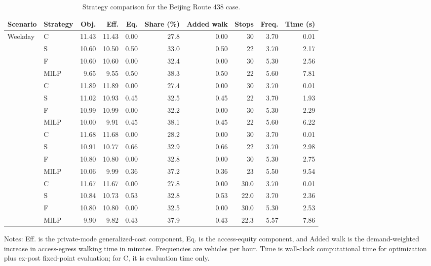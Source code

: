 \begin{table}[htbp]
\centering
\small
\caption{Strategy comparison for the Beijing Route 438 case.}
\label{tab:route438_strategy}
\begin{threeparttable}
\begin{tabular}{llrrrrrrrr}
\toprule
Scenario & Strategy & Obj. & Eff. & Eq. & Share (\%) & Added walk & Stops & Freq. & Time (s) \\
\midrule
\multirow{4}{*}{Weekday} & C & 11.43 & 11.43 & 0.00 & 27.8 & 0.00 & 30 & 3.70 & 0.01 \\
 & S & 10.60 & 10.50 & 0.50 & 33.0 & 0.50 & 22 & 3.70 & 2.17 \\
 & F & 10.60 & 10.60 & 0.00 & 32.4 & 0.00 & 30 & 5.30 & 2.56 \\
 & MILP & 9.65 & 9.55 & 0.50 & 38.3 & 0.50 & 22 & 5.60 & 7.81 \\
\addlinespace[1.5pt]
\multirow{4}{*}{Weekend} & C & 11.89 & 11.89 & 0.00 & 27.4 & 0.00 & 30 & 3.70 & 0.01 \\
 & S & 11.02 & 10.93 & 0.45 & 32.5 & 0.45 & 22 & 3.70 & 1.93 \\
 & F & 10.99 & 10.99 & 0.00 & 32.2 & 0.00 & 30 & 5.30 & 2.29 \\
 & MILP & 10.00 & 9.91 & 0.45 & 38.1 & 0.45 & 22 & 5.60 & 6.22 \\
\addlinespace[1.5pt]
\multirow{4}{*}{Holiday} & C & 11.68 & 11.68 & 0.00 & 28.2 & 0.00 & 30 & 3.70 & 0.01 \\
 & S & 10.91 & 10.77 & 0.66 & 32.9 & 0.66 & 22 & 3.70 & 2.98 \\
 & F & 10.80 & 10.80 & 0.00 & 32.8 & 0.00 & 30 & 5.30 & 2.75 \\
 & MILP & 10.06 & 9.99 & 0.36 & 37.2 & 0.36 & 23 & 5.50 & 9.54 \\
\addlinespace[1.5pt]
\multirow{4}{*}{Average} & C & 11.67 & 11.67 & 0.00 & 27.8 & 0.00 & 30.0 & 3.70 & 0.01 \\
 & S & 10.84 & 10.73 & 0.53 & 32.8 & 0.53 & 22.0 & 3.70 & 2.36 \\
 & F & 10.80 & 10.80 & 0.00 & 32.5 & 0.00 & 30.0 & 5.30 & 2.53 \\
 & MILP & 9.90 & 9.82 & 0.43 & 37.9 & 0.43 & 22.3 & 5.57 & 7.86 \\
\bottomrule
\end{tabular}
\begin{tablenotes}
\footnotesize
\item Notes: Eff. is the private-mode generalized-cost component, Eq. is the access-equity component, and Added walk is the demand-weighted increase in access-egress walking time in minutes. Frequencies are vehicles per hour. Time is wall-clock computational time for optimization plus ex-post fixed-point evaluation; for C, it is evaluation time only. 
\end{tablenotes}
\end{threeparttable}
\end{table}
